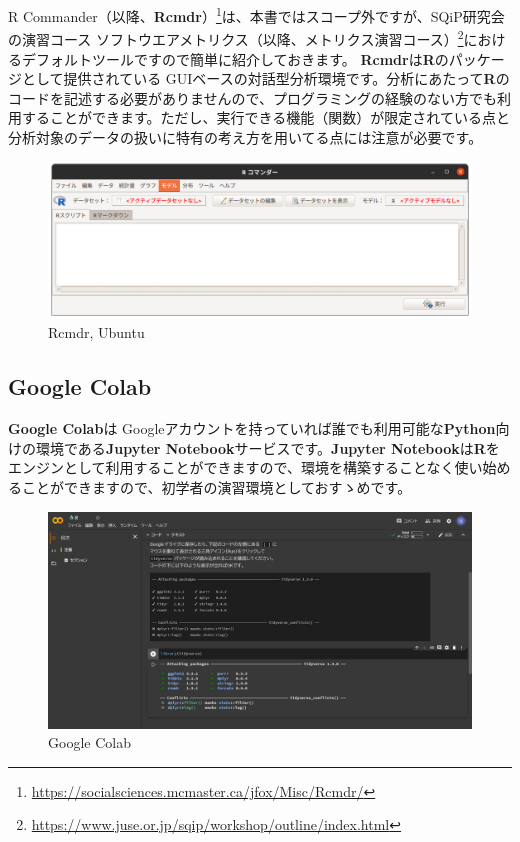 \documentclass[
  12pt,
]{book}
\DeclareRobustCommand{\href}[2]{#2\footnote{\url{#1}}}
\begin{document}
\href{https://socialsciences.mcmaster.ca/jfox/Misc/Rcmdr/}{R Commander（以降、\textbf{Rcmdr}）}は、本書ではスコープ外ですが、\href{https://www.juse.or.jp/sqip/workshop/outline/index.html}{SQiP研究会の演習コース ソフトウエアメトリクス（以降、メトリクス演習コース）}におけるデフォルトツールですので簡単に紹介しておきます。 \textbf{Rcmdr}は\textbf{R}のパッケージとして提供されている GUIベースの対話型分析環境です。分析にあたって\textbf{R}のコードを記述する必要がありませんので、プログラミングの経験のない方でも利用することができます。ただし、実行できる機能（関数）が限定されている点と分析対象のデータの扱いに特有の考え方を用いてる点には注意が必要です。

\begin{figure}[H]

{\centering \includegraphics[width=0.9\linewidth,]{./fig/RCmdr} 

}

\caption{Rcmdr, Ubuntu}\label{fig:unnamed-chunk-13}
\end{figure}

\hypertarget{google-colab}{%
\subsection{Google Colab}\label{google-colab}}

\textbf{Google Colab}は Googleアカウントを持っていれば誰でも利用可能な\textbf{Python}向けの環境である\textbf{Jupyter Notebook}サービスです。\textbf{Jupyter Notebook}は\textbf{R}をエンジンとして利用することができますので、環境を構築することなく使い始めることができますので、初学者の演習環境としておすゝめです。

\begin{figure}[H]

{\centering \includegraphics[width=0.9\linewidth,]{./fig/Colab/Firsttime} 

}

\caption{Google Colab}\label{fig:unnamed-chunk-14}
\end{figure}
\end{document}
